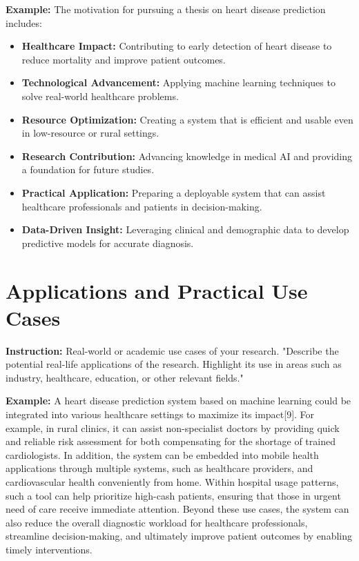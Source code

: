  \textbf{\color{blue} Example:} The motivation for pursuing a thesis on heart disease prediction includes:

\begin{itemize}
    \item \textbf{Healthcare Impact:} Contributing to early detection of heart disease to reduce mortality and improve patient outcomes.
    \item \textbf{Technological Advancement:} Applying machine learning techniques to solve real-world healthcare problems.
    \item \textbf{Resource Optimization:} Creating a system that is efficient and usable even in low-resource or rural settings.
    \item \textbf{Research Contribution:} Advancing knowledge in medical AI and providing a foundation for future studies.
    \item \textbf{Practical Application:} Preparing a deployable system that can assist healthcare professionals and patients in decision-making.
    \item \textbf{Data-Driven Insight:} Leveraging clinical and demographic data to develop predictive models for accurate diagnosis.
\end{itemize}

\section{Applications and Practical Use Cases}

{\color{red} \textbf{  Instruction:} Real-world or academic use cases of your research. "Describe the potential real-life applications of the research. Highlight its use in areas such as industry, healthcare, education, or other relevant fields."}

 \textbf{\color{blue} Example:} A heart disease prediction system based on machine learning could be integrated into various healthcare settings to maximize its impact[9]. For example, in rural clinics, it can assist non-specialist doctors by providing quick and reliable risk assessment for both compensating for the shortage of trained cardiologists. In addition, the system can be embedded into mobile health applications through multiple systems, such as healthcare providers, and cardiovascular health conveniently from home. Within hospital usage patterns, such a tool can help prioritize high-cash patients, ensuring that those in urgent need of care receive immediate attention. Beyond these use cases, the system can also reduce the overall diagnostic workload for healthcare professionals, streamline decision-making, and ultimately improve patient outcomes by enabling timely interventions.

